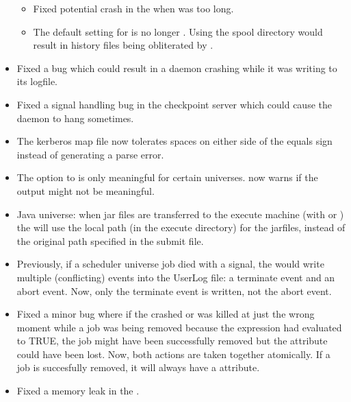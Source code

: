 \begin{itemize}
\begin{itemize}
  \item Fixed potential crash in the  when
     was too long.

  \item The default setting for  is no
    longer .
    Using the spool directory would result in history files being
    obliterated by .

\end{itemize}

\item Fixed a bug which could result in a daemon crashing while it was
	writing to its logfile.

\item Fixed a signal handling bug in the checkpoint server which could
  cause the daemon to hang sometimes.

\item The kerberos map file now tolerates spaces on either side of the
	equals sign instead of generating a parse error.

\item The  option to  is only meaningful for certain
  universes.   now warns if the output might not be meaningful. 

\item Java universe: when jar files are transferred to the execute
  machine (with  or
  ) the  will use the
  local path (in the execute directory) for the jarfiles, instead of
  the original path specified in the submit file.

\item Previously, if a scheduler universe job died with a signal, the
   would write multiple (conflicting) events into the
  UserLog file: a terminate event and an abort event.
  Now, only the terminate event is written, not the abort event.

\item Fixed a minor bug where if the  crashed or was
  killed at just the wrong moment while a job was being removed
  because the  expression had evaluated to
  TRUE, the job might have been successfully removed but the
   attribute could have been lost.
  Now, both actions are taken together atomically.
  If a job is succesfully removed, it will always have a
   attribute.

\item Fixed a memory leak in the .

\end{itemize}

